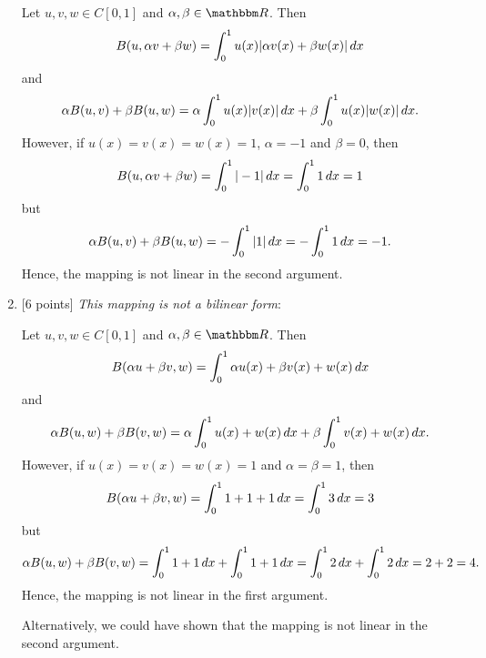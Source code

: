 \begin{solution}
\begin{enumerate}
Let $u,v,w\in C[0,1]$ and $\alpha,\beta\in\R$. Then
\[ B(u,\alpha v + \beta w) = \int_0^1 u(x)|\alpha v(x)+\beta w(x)| \, d x\]
and
\[ \alpha B(u,v) + \beta B(u,w) = \alpha\int_0^1 u(x) |v(x)|\, d x+\beta\int_0^1 u(x) |w(x)|\, d x.\]
However, if $u(x)=v(x)=w(x)=1$, $\alpha=-1$ and $\beta=0$, then
\[ B(u,\alpha v + \beta w) = \int_0^1 |-1| \, d x = \int_0^1 1 \, d x=1\]
but
\[ \alpha B(u,v) + \beta B(u,w) = -\int_0^1 |1|\, d x=-\int_0^1 1\, d x=-1.\]
Hence, the mapping is not linear in the second argument.

\item {[6 points]} \emph{This mapping is not a bilinear form}: 

Let $u,v,w\in C[0,1]$ and $\alpha,\beta\in\R$. Then
\[ B(\alpha u + \beta v, w) = \int_0^1\alpha u(x)+\beta v(x) + w(x) \,dx\]
and
\[ \alpha B(u,w) + \beta B(v,w) = \alpha\int_0^1 u(x)+ w(x) \,dx+\beta\int_0^1 v(x) + w(x) \,dx.\]
However, if $u(x)=v(x)=w(x)=1$ and $\alpha=\beta=1$, then
\[ B(\alpha u+\beta v,w) = \int_0^1 1+1+1 \, d x = \int_0^1 3 \, d x=3\]
but
\[ \alpha B(u,w) + \beta B(v,w) = \int_0^1 1+1\, d x + \int_0^1 1+1\, d x=\int_0^1 2\, d x + \int_0^1 2\, d x=2+2=4.\]
Hence, the mapping is not linear in the first argument.

Alternatively, we could have shown that the mapping is not linear in the second argument.

\end{enumerate}
\end{solution}
